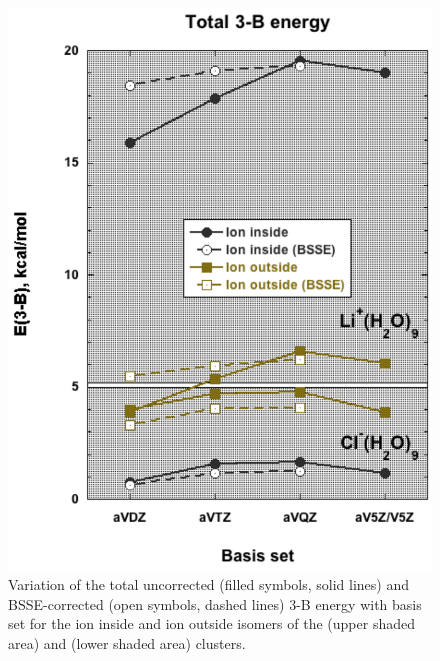 \begin{figure}[h]
\uwsinglespace
\centering
\includegraphics[width=.5\textwidth]{Figures/Chapter_3/figure_4.pdf}
\caption[Variation of the total uncorrected (filled symbols, solid lines) and BSSE-corrected (open symbols, dashed lines) 3-B energy with basis set for the ion inside and ion outside isomers of the  (upper shaded area) and  (lower shaded area) clusters.]{Variation of the total uncorrected (filled symbols, solid lines) and BSSE-corrected (open symbols, dashed lines) 3-B energy with basis set for the ion inside and ion outside isomers of the  (upper shaded area) and  (lower shaded area) clusters.}
\label{fig:MBE_II_4}
\end{figure}
